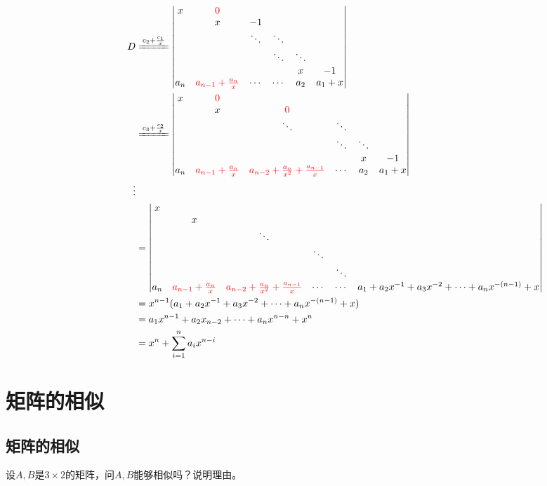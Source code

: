 \documentclass[a4paper]{report}
\begin{document}
\begin{jie}
\begin{align*}
D&\xlongequal{c_2+\frac{c_1}{x}}
\begin{vmatrix}
x&\textcolor[rgb]{1.00,0.00,0.00}{0}\\
&x&-1\\
&&\ddots&\ddots\\
&&&\ddots&\ddots\\
&&&&x&-1\\
a_{n}&\textcolor[rgb]{1.00,0.00,0.00}{a_{n-1}+\frac{a_n}{x}}&\cdots&\cdots&a_2&a_1+x
\end{vmatrix}\\ &\xlongequal{c_3+\frac{c_2}{x}}
\begin{vmatrix}
x&\textcolor[rgb]{1.00,0.00,0.00}{0}\\
&x&\textcolor[rgb]{1.00,0.00,0.00}{0}\\
&&\ddots&\ddots\\
&&&\ddots&\ddots\\
&&&&x&-1\\
a_{n}&\textcolor[rgb]{1.00,0.00,0.00}{a_{n-1}+\frac{a_n}{x}}&\textcolor[rgb]{1.00,0.00,0.00}{a_{n-2}+\frac{a_n}{x^2}+\frac{a_{n-1}}{x}}&\cdots&a_2&a_1+x
\end{vmatrix}
\\
\hphantom{~~~~~~~~~~~~~~~~~~}\vdots
\\
&=\begin{vmatrix}
x\\
&x\\
&&\ddots\\
&&&\ddots\\
&&&&\ddots&\\
a_{n}&\textcolor[rgb]{1.00,0.00,0.00}{a_{n-1}+\frac{a_n}{x}}&\textcolor[rgb]{1.00,0.00,0.00}{a_{n-2}+\frac{a_n}{x^2}+\frac{a_{n-1}}{x}}&\cdots&\cdots&a_1+a_2x^{-1}+a_{3}x^{-2}+\cdots+a_nx^{-(n-1)}+x
\end{vmatrix}
\\
&=x^{n-1}(a_1+a_2x^{-1}+a_{3}x^{-2}+\cdots+a_nx^{-(n-1)}+x)\\
&=a_1x^{n-1}+a_2x_{n-2}+\cdots+a_nx^{n-n}+x^{n}\\
&=x^{n}+\sum_{i=1}^{n}a_ix^{n-i}
\end{align*}
\end{jie}

\chapter{矩阵的相似}
\section{矩阵的相似}
\EX 设$A,B$是$3\times2$的矩阵，问$A,B$能够相似吗？说明理由。
\end{document}
